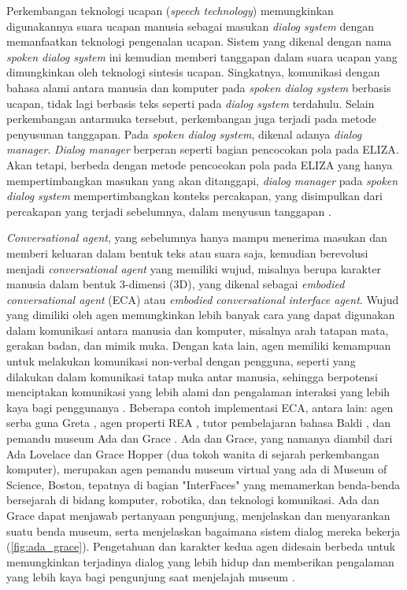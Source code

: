 Perkembangan teknologi ucapan (\textit{speech technology}) memungkinkan digunakannya suara ucapan manusia sebagai masukan \textit{dialog system} dengan memanfaatkan teknologi pengenalan ucapan. Sistem yang dikenal dengan nama \textit{spoken dialog system} ini kemudian memberi tanggapan dalam suara ucapan yang dimungkinkan oleh teknologi sintesis ucapan. Singkatnya, komunikasi dengan bahasa alami antara manusia dan komputer pada \textit{spoken dialog system} berbasis ucapan, tidak lagi berbasis teks seperti pada \textit{dialog system} terdahulu. Selain perkembangan antarmuka tersebut, perkembangan juga terjadi pada metode penyusunan tanggapan. Pada \textit{spoken dialog system}, dikenal adanya \textit{dialog manager}. \textit{Dialog manager} berperan seperti bagian pencocokan pola pada ELIZA. Akan tetapi, berbeda dengan metode pencocokan pola pada ELIZA yang hanya mempertimbangkan masukan yang akan ditanggapi, \textit{dialog manager} pada \textit{spoken dialog system} mempertimbangkan konteks percakapan, yang disimpulkan dari percakapan yang terjadi sebelumnya, dalam menyusun tanggapan \cite{mctear2002, jurafsky2009, cole1997}.


\textit{Conversational agent}, yang sebelumnya hanya mampu menerima masukan dan memberi keluaran dalam bentuk teks atau suara saja, kemudian berevolusi menjadi \textit{conversational agent} yang memiliki wujud, misalnya berupa karakter manusia dalam bentuk 3-dimensi (3D), yang dikenal sebagai \textit{embodied conversational agent} (ECA) atau \textit{embodied conversational interface agent}. Wujud yang dimiliki oleh agen memungkinkan lebih banyak cara yang dapat digunakan dalam komunikasi antara manusia dan komputer, misalnya arah tatapan mata, gerakan badan, dan mimik muka. Dengan kata lain, agen memiliki kemampuan untuk melakukan komunikasi non-verbal dengan pengguna, seperti yang dilakukan dalam komunikasi tatap muka antar manusia, sehingga berpotensi menciptakan komunikasi yang lebih alami dan pengalaman interaksi yang lebih kaya bagi penggunanya \cite{beun2003, cassell1999, cassell2000, cassell2000a, rehm2005, rickel2002, foster2007}. Beberapa contoh implementasi ECA, antara lain: agen serba guna Greta \cite{niewiadomski2009}, agen properti REA \cite{cassell1999}, tutor pembelajaran bahasa Baldi \cite{massaro2006}, dan pemandu museum Ada dan Grace \cite{swartout2010}. Ada dan Grace, yang namanya diambil dari Ada Lovelace dan Grace Hopper (dua tokoh wanita di sejarah perkembangan komputer), merupakan agen pemandu museum virtual yang ada di Museum of Science, Boston, tepatnya di bagian "InterFaces" yang memamerkan benda-benda bersejarah di bidang komputer, robotika, dan teknologi komunikasi. Ada dan Grace dapat menjawab pertanyaan pengunjung, menjelaskan dan menyarankan suatu benda museum, serta menjelaskan bagaimana sistem dialog mereka bekerja (\autoref{fig:ada_grace}). Pengetahuan dan karakter kedua agen didesain berbeda untuk memungkinkan terjadinya dialog yang lebih hidup dan memberikan pengalaman yang lebih kaya bagi pengunjung saat menjelajah museum \cite{themuseumofscienceboston-, uscinstituteforcreativetechnologies-}.

